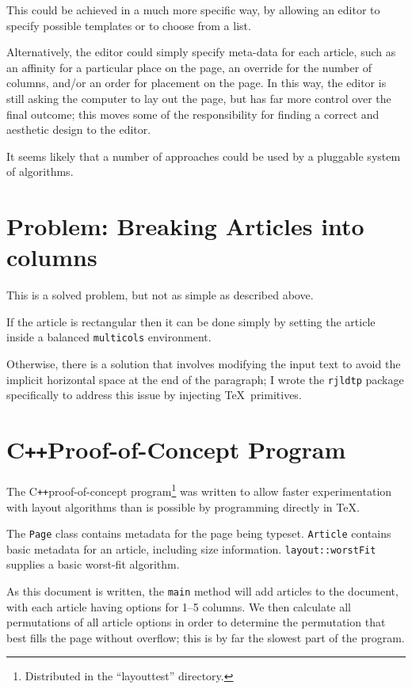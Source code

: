 \documentclass[a4paper]{scrartcl}
\newcommand{\cpp}{\mbox{C\texttt{++}}}
\begin{document}
This could be achieved in a much more specific way, by allowing an
editor to specify possible templates or to choose from a list.

Alternatively, the editor could simply specify meta-data for each
article, such as an affinity for a particular place on the page, an
override for the number of columns, and/or an order for placement on
the page. In this way, the editor is still asking the computer to lay
out the page, but has far more control over the final outcome; this
moves some of the responsibility for finding a correct and aesthetic
design to the editor.


It seems likely that a number of approaches could be used by a
pluggable system of algorithms.

\section{Problem: Breaking Articles into columns}

This is a solved problem, but not as simple as described above.

If the article is rectangular then it can be done simply by setting
the article inside a balanced \verb!multicols! environment.

Otherwise, there is a solution that involves modifying the input text
to avoid the implicit horizontal space at the end of the paragraph; I
wrote the \verb!rjldtp! package specifically to address this issue by
injecting \TeX\ primitives.

\section*{\cpp Proof-of-Concept Program}

The \cpp proof-of-concept program\footnote{Distributed in the
  ``layouttest'' directory.} was written to allow faster
experimentation with layout algorithms than is possible by programming
directly in \TeX.

The \texttt{Page} class contains metadata for the page being typeset.
\texttt{Article} contains basic metadata for an article, including
size information.
\texttt{layout::worstFit} supplies a basic worst-fit algorithm.

As this document is written, the \texttt{main} method will add
articles to the document, with each article having options for 1--5
columns. We then calculate all permutations of all article options in
order to determine the permutation that best fills the page without
overflow; this is by far the slowest part of the program.
\end{document}
